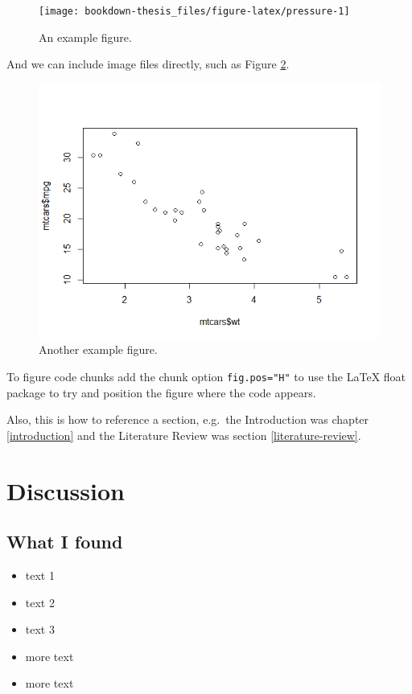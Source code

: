 \documentclass[]{book}
\providecommand{\tightlist}{%
  \setlength{\itemsep}{0pt}\setlength{\parskip}{0pt}}
\begin{document}
\begin{figure}[H]

{\centering \texttt{[image: bookdown-thesis\_files/figure-latex/pressure-1]} 

}

\caption{An example figure.}\label{fig:pressure}
\end{figure}

And we can include image files directly, such as Figure \ref{fig:knitlogo}.

\begin{figure}

{\centering \includegraphics[width=0.75\linewidth]{img/mtcars-scatter} 

}

\caption{Another example figure.}\label{fig:knitlogo}
\end{figure}

To figure code chunks add the chunk option \texttt{fig.pos="H"} to use the LaTeX float package to try and position the figure where the code appears.

Also, this is how to reference a section, e.g.~the Introduction was chapter \ref{introduction} and the Literature Review was section \ref{literature-review}.

\hypertarget{discussion}{%
\chapter{Discussion}\label{discussion}}

\hypertarget{what-i-found}{%
\section{What I found}\label{what-i-found}}

\begin{itemize}
\tightlist
\item
  text 1
\item
  text 2
\item
  text 3
\item
  more text
\item
  more text
\end{itemize}
\end{document}
